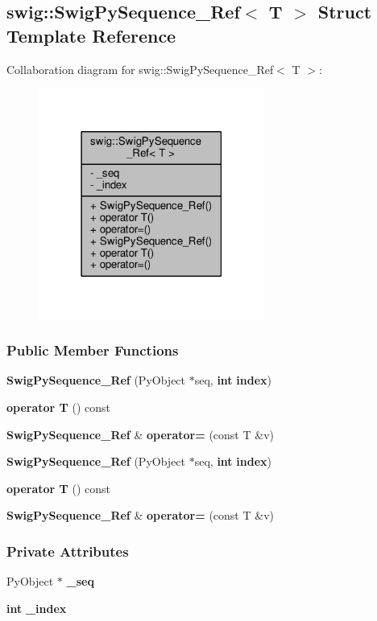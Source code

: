 \subsection{swig\+:\+:Swig\+Py\+Sequence\+\_\+\+Ref$<$ T $>$ Struct Template Reference}
\label{structswig_1_1SwigPySequence__Ref}


Collaboration diagram for swig\+:\+:Swig\+Py\+Sequence\+\_\+\+Ref$<$ T $>$\+:
\nopagebreak
\begin{figure}[H]
\begin{center}
\leavevmode
\includegraphics[width=210pt]{d7/de2/structswig_1_1SwigPySequence__Ref__coll__graph}
\end{center}
\end{figure}
\subsubsection*{Public Member Functions}
\begin{DoxyCompactItemize}
\item 
{\bf Swig\+Py\+Sequence\+\_\+\+Ref} (Py\+Object $\ast$seq, {\bf int} {\bf index})
\item 
{\bf operator T} () const 
\item 
{\bf Swig\+Py\+Sequence\+\_\+\+Ref} \& {\bf operator=} (const T \&v)
\item 
{\bf Swig\+Py\+Sequence\+\_\+\+Ref} (Py\+Object $\ast$seq, {\bf int} {\bf index})
\item 
{\bf operator T} () const 
\item 
{\bf Swig\+Py\+Sequence\+\_\+\+Ref} \& {\bf operator=} (const T \&v)
\end{DoxyCompactItemize}
\subsubsection*{Private Attributes}
\begin{DoxyCompactItemize}
\item 
Py\+Object $\ast$ {\bf \+\_\+seq}
\item 
{\bf int} {\bf \+\_\+index}
\end{DoxyCompactItemize}


